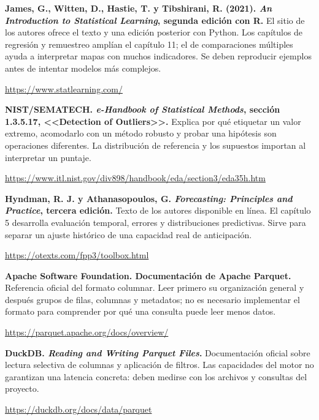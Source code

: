 \begin{enumerate}[label={[\arabic*]},ref=\arabic*,leftmargin=2.2em,itemsep=1em]
\item\label{src:isl} \textbf{James, G., Witten, D., Hastie, T. y Tibshirani, R. (2021).
\emph{An Introduction to Statistical Learning}, segunda edición con R.}
El sitio de los autores ofrece el texto y una edición posterior con Python. Los
capítulos de regresión y remuestreo amplían el capítulo 11; el de comparaciones múltiples
ayuda a interpretar mapas con muchos indicadores. Se deben reproducir ejemplos antes
de intentar modelos más complejos.
\par\url{https://www.statlearning.com/}

\item\label{src:nist} \textbf{NIST/SEMATECH. \emph{e-Handbook of Statistical Methods},
sección 1.3.5.17, <<Detection of Outliers>>.} Explica por qué etiquetar un valor extremo,
acomodarlo con un método robusto y probar una hipótesis son operaciones diferentes.
La distribución de referencia y los supuestos importan al interpretar un puntaje.
\par\url{https://www.itl.nist.gov/div898/handbook/eda/section3/eda35h.htm}

\item\label{src:forecast} \textbf{Hyndman, R. J. y Athanasopoulos, G.
\emph{Forecasting: Principles and Practice}, tercera edición.}
Texto de los autores disponible en línea. El capítulo 5 desarrolla evaluación temporal,
errores y distribuciones predictivas. Sirve para separar un ajuste histórico de una
capacidad real de anticipación.
\par\url{https://otexts.com/fpp3/toolbox.html}

\item\label{src:parquet} \textbf{Apache Software Foundation. Documentación de Apache
Parquet.} Referencia oficial del formato columnar. Leer primero su organización general
y después grupos de filas, columnas y metadatos; no es necesario implementar el formato
para comprender por qué una consulta puede leer menos datos.
\par\url{https://parquet.apache.org/docs/overview/}

\item\label{src:duckdb} \textbf{DuckDB. \emph{Reading and Writing Parquet Files}.}
Documentación oficial sobre lectura selectiva de columnas y aplicación de filtros.
Las capacidades del motor no garantizan una latencia concreta: deben medirse con los
archivos y consultas del proyecto.
\par\url{https://duckdb.org/docs/data/parquet}


\end{enumerate}
